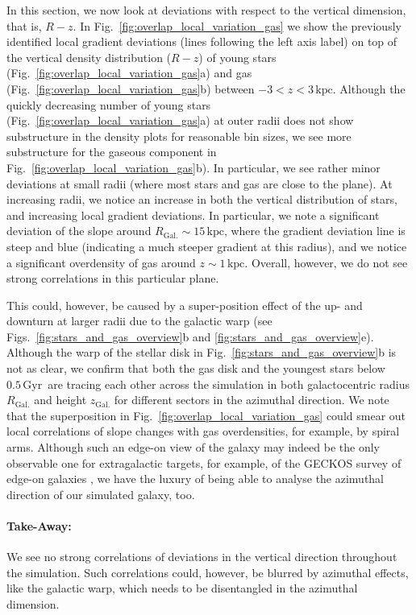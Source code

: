 \documentclass[twocolumn,apj,numberedappendix,appendixfloats,twocolappendix]{openjournal}
\newcommand{\nihaoAGEmax}{$0.5\,\mathrm{Gyr}$}
\begin{document}
\begin{CJK*}{UTF8}{gbsn}
In this section, we now look at deviations with respect to the vertical dimension, that is, $R-z$. In Fig.~\ref{fig:overlap_local_variation_gas} we show the previously identified local gradient deviations (lines following the left axis label) on top of the vertical density distribution ($R-z$) of young stars (Fig.~\ref{fig:overlap_local_variation_gas}a) and gas (Fig.~\ref{fig:overlap_local_variation_gas}b) between $-3 < z < 3\,\mathrm{kpc}$. Although the quickly decreasing number of young stars (Fig.~\ref{fig:overlap_local_variation_gas}a) at outer radii does not show substructure in the density plots for reasonable bin sizes, we see more substructure for the gaseous component in Fig.~\ref{fig:overlap_local_variation_gas}b). In particular, we see rather minor deviations at small radii (where most stars and gas are close to the plane). At increasing radii, we notice an increase in both the vertical distribution of stars, and increasing local gradient deviations. In particular, we note a significant deviation of the slope around $R_\mathrm{Gal.} \sim 15\,\mathrm{kpc}$, where the gradient deviation line is steep and blue (indicating a much steeper gradient at this radius), and we notice a significant overdensity of gas around $z \sim 1\,\mathrm{kpc}$. Overall, however, we do not see strong correlations in this particular plane.

This could, however, be caused by a super-position effect of the up- and downturn at larger radii due to the galactic warp (see Figs.~\ref{fig:stars_and_gas_overview}b and \ref{fig:stars_and_gas_overview}e). Although the warp of the stellar disk in Fig.~\ref{fig:stars_and_gas_overview}b is not as clear, we confirm that both the gas disk and the youngest stars below \nihaoAGEmax\ are tracing each other across the simulation in both galactocentric radius $R_\mathrm{Gal.}$ and height $z_\mathrm{Gal.}$ for different sectors in the azimuthal direction. We note that the superposition in Fig.~\ref{fig:overlap_local_variation_gas} could smear out local correlations of slope changes with gas overdensities, for example, by spiral arms. Although such an edge-on view of the galaxy may indeed be the only observable one for extragalactic targets, for example, of the GECKOS survey of edge-on galaxies \citep{GECKOS2023}, we have the luxury of being able to analyse the azimuthal direction of our simulated galaxy, too. 

\paragraph*{Take-Away:} We see no strong correlations of deviations in the vertical direction throughout the simulation. Such correlations could, however, be blurred by azimuthal effects, like the galactic warp, which needs to be disentangled in the azimuthal dimension.


\end{CJK*}
\end{document}
